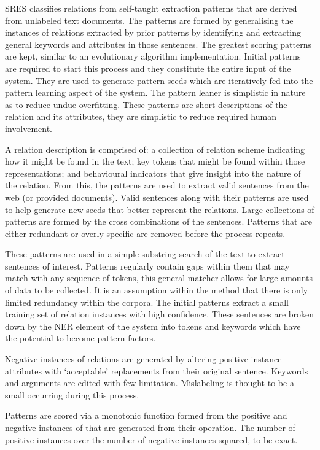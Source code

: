 \documentclass{ecmm427_assignment}
\begin{document}
SRES classifies relations from self-taught extraction patterns that are derived from unlabeled text documents. The patterns are formed by generalising the instances of relations extracted by prior patterns by identifying and extracting general keywords and attributes in those sentences. The greatest scoring patterns are kept, similar to an evolutionary algorithm implementation. Initial patterns are required to start this process and they constitute the entire input of the system. They are used to generate pattern seeds which are iteratively fed into the pattern learning aspect of the system. The pattern leaner is simplistic in nature as to reduce undue overfitting.  These patterns are short descriptions of the relation and its attributes, they are simplistic to reduce required human involvement.

A relation description is comprised of: a collection of relation scheme indicating how it might be found in the text; key tokens that might be found within those representations; and behavioural indicators that give insight into the nature of the relation. From this, the patterns are used to extract valid sentences from the web (or provided documents). Valid sentences along with their patterns are used to help generate new seeds that better represent the relations. Large collections of patterns are formed by the cross combinations of the sentences. Patterns that are either redundant or overly specific are removed before the process repeats. 

These patterns are used in a simple substring search of the text to extract sentences of interest. Patterns regularly contain gaps within them that may match with any sequence of tokens, this general matcher allows for large amounts of data to be collected. It is an assumption within the method that there is only limited redundancy within the corpora. The initial patterns extract a small training set of relation instances with high confidence. These sentences are broken down by the NER element of the system into tokens and keywords which have the potential to become pattern factors.

Negative instances of relations are generated by altering positive instance attributes with `acceptable' replacements from their original sentence. Keywords and arguments are edited with few limitation. Mislabeling is thought to be a small occurring during this process.

Patterns are scored via a monotonic function formed from the positive and negative instances of that are generated from their operation. The number of positive instances over the number of negative instances squared, to be exact.
\end{document}
